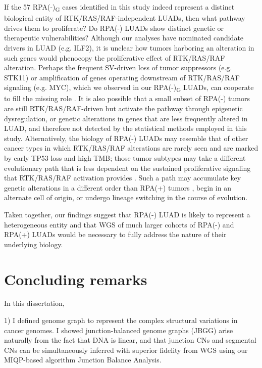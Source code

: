 \documentclass[phd,tocprelim]{cornell}
\begin{document}
If the 57 RPA(-)\textsubscript{G} cases identified in this study indeed represent a distinct biological entity of RTK/RAS/RAF-independent LUADs, then what pathway drives them to proliferate? Do RPA(-) LUADs show distinct genetic or therapeutic vulnerabilities? Although our analyses have nominated candidate drivers in LUAD (e.g. ILF2), it is unclear how tumors harboring an alteration in such genes would phenocopy the proliferative effect of RTK/RAS/RAF alteration. Perhaps the frequent SV-driven loss of tumor suppressors (e.g. STK11) or amplification of genes operating downstream of RTK/RAS/RAF signaling (e.g. MYC), which we observed in our RPA(-)\textsubscript{G} LUADs, can cooperate to fill the missing role \cite{Sears2000-ua}
. It is also possible that a small subset of RPA(-) tumors are still RTK/RAS/RAF-driven but activate the pathway through epigenetic dysregulation, or genetic alterations in genes that are less frequently altered in LUAD, and therefore not detected by the statistical methods employed in this study. Alternatively, the biology of RPA(-) LUADs may resemble that of other cancer types in which RTK/RAS/RAF alterations are rarely seen and are marked by early TP53 loss and high TMB; those tumor subtypes may take a different evolutionary path that is less dependent on the sustained proliferative signaling that RTK/RAS/RAF activation provides \cite{Chen2019-bi,Drosten2014-el,Salgueiro2020-xg}. Such a path may accumulate key genetic alterations in a different order than RPA(+) tumors \cite{Lee2019-nm}, begin in an alternate cell of origin, or undergo lineage switching in the course of evolution.

Taken together, our findings suggest that RPA(-) LUAD is likely to represent a heterogeneous entity and that WGS of much larger cohorts of RPA(-) and RPA(+) LUADs would be necessary to fully address the nature of their underlying biology.

\chapter*{Concluding remarks}
In this dissertation, 

1) I defined genome graph to represent the complex structural variations in cancer genomes. I showed junction-balanced genome graphs (JBGG) arise naturally from the fact that DNA is linear, and that junction CNs and segmental CNs can be simultaneously inferred with superior fidelity from WGS using our MIQP-based algorithm Junction Balance Analysis.
\end{document}
